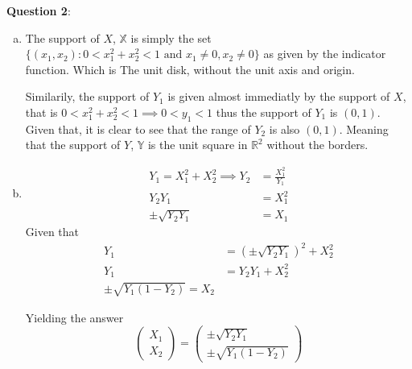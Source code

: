 \documentclass{article} %
\newcommand{\question}[2][]{
  \begin{flushleft}
    \textbf{Question #1}: \textit{#2}

\end{flushleft}}
\begin{document}
\question[2]{ }
\begin{enumerate}[(a)]
  \item The support of $X$, $\mathbb{X}$ is simply the set $\{(x_1,
    x_2): 0 < x_1^2 + x_2^2 < 1 \text{ and } x_1\neq0, x_2\neq0\}$ as
    given by the indicator function. Which is The unit disk, without
    the unit axis and origin.

    Similarily, the support of $Y_1$ is given almost immediatly by
    the support of $X$, that is $0 < x_1^2 + x_2^2 < 1 \implies 0 <
    y_1 < 1$ thus the support of $Y_1$ is $(0,1)$. Given that, it is
    clear to see that the range of $Y_2$ is also $(0,1)$. Meaning
    that the support of $Y$, $\mathbb{Y}$ is the unit square in
    $\mathbb{R}^2$ without the borders.
  \item
    \begin{align*}
      Y_1 = X_1^2 + X_2^2 \implies Y_2 &= \frac{X_1^2}{Y_1} \\
      Y_2Y_1 &= X_1^2 \\
      \pm\sqrt{Y_2Y_1} &= X_1
    \end{align*}
    Given that
    \begin{align*}
      Y_1 &= (\pm\sqrt{Y_2Y_1})^2 + X_2^2 \\
      Y_1 &= Y_2Y_1 + X_2^2\\
      \pm\sqrt{Y_1(1 - Y_2)} = X_2
    \end{align*}

    Yielding the answer
    \[
      \begin{pmatrix}
        X_1 \\ X_2
      \end{pmatrix}
      =
      \begin{pmatrix}
        \pm\sqrt{Y_2Y_1} \\
        \pm\sqrt{Y_1(1-Y_2)}
      \end{pmatrix}
    \]


\end{enumerate}
\end{document}
